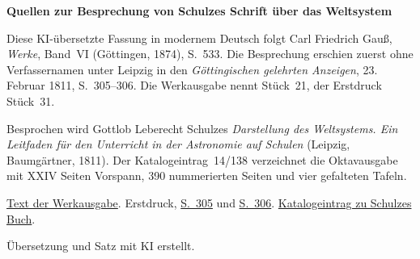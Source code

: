 \clearpage\thispagestyle{empty}
\begin{center}\textbf{Quellen zur Besprechung von Schulzes Schrift über das Weltsystem}\end{center}
\noindent Diese KI-übersetzte Fassung in modernem Deutsch folgt Carl Friedrich Gauß, \textit{Werke}, Band~VI (Göttingen, 1874), S.~533. Die Besprechung erschien zuerst ohne Verfassernamen unter Leipzig in den \textit{Göttingischen gelehrten Anzeigen}, 23. Februar 1811, S.~305--306. Die Werkausgabe nennt Stück~21, der Erstdruck Stück~31.
\par\smallskip\noindent Besprochen wird Gottlob Leberecht Schulzes \textit{Darstellung des Weltsystems. Ein Leitfaden für den Unterricht in der Astronomie auf Schulen} (Leipzig, Baumgärtner, 1811). Der Katalogeintrag~14/138 verzeichnet die Oktavausgabe mit XXIV Seiten Vorspann, 390 nummerierten Seiten und vier gefalteten Tafeln.
\par\smallskip\noindent \href{https://gdz.sub.uni-goettingen.de/id/PPN236007467}{Text der Werkausgabe}. Erstdruck, \href{https://images.p.sub.uni-goettingen.de/iiif/image/gdz:PPN319721507_1811:00000337/full/1650,/0/default.jpg}{S.~305} und \href{https://images.p.sub.uni-goettingen.de/iiif/image/gdz:PPN319721507_1811:00000338/full/1650,/0/default.jpg}{S.~306}. \href{https://d-nb.info/975382632/34}{Katalogeintrag zu Schulzes Buch}.
\par\smallskip\noindent Übersetzung und Satz mit KI erstellt.
\clearpage
